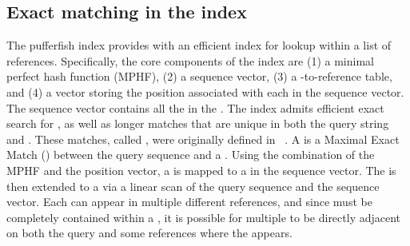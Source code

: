 \subsection{Exact matching in the \pufferfish index}

The pufferfish index provides \puffaligner with an efficient index for \kmer lookup within a list of references. 
Specifically, the core components of the index are (1) a minimal perfect hash function (MPHF), (2) a \unitig 
sequence vector, (3) a \unitig-to-reference table, and (4) a vector storing the position associated with each
\kmer in the \unitig sequence vector. The \unitig sequence vector contains all the \unitigs in the 
\ccdbgshort. The \pufferfish index admits efficient exact search for \kmers, as well as longer matches
that are unique in both the query string and \ccdbg. These matches, called \unimem, were originally 
defined in \debga~\citep{debga}. A \unimem is a Maximal Exact Match (\mem) between the query sequence
and a \unitig. Using the combination of the MPHF and the position vector, a \kmer is mapped to a \unitig 
in the \unitig sequence vector. The \kmer is then extended to a \unimem via a linear scan 
of the query sequence and the \unitig sequence vector. Each \unimem can appear  in multiple different references, 
and since \unimems must be completely contained within a \unitig, it is possible for multiple 
\unimems to be directly adjacent on both the query and some references where the \unitig appears.

